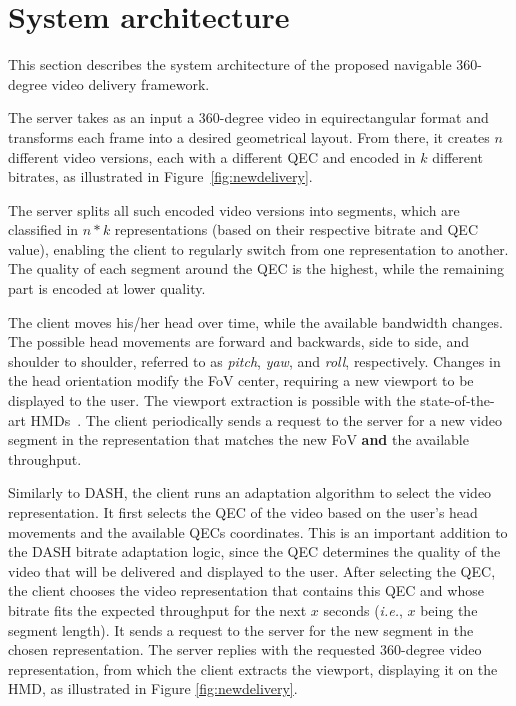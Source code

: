 \section{System architecture}

This section describes the system architecture of the proposed navigable 360-degree video delivery framework. %

 The server takes as an input a 360-degree video in equirectangular format and transforms each frame into a desired geometrical layout. From there, it creates $n$ different video versions, each with a different QEC and encoded in $k$ different bitrates, as illustrated in Figure~\ref{fig:newdelivery}.

The server splits all such encoded video versions into segments, which are classified in $n*k$ representations (based on their respective bitrate and QEC value), enabling the client to regularly switch from one representation to another. The quality of each segment around the QEC is the highest, while the remaining part is encoded at lower quality.

 The client moves his/her head over time, while the available bandwidth changes. The possible head movements are forward and backwards, side to side, and shoulder to shoulder, referred to as \emph{pitch}, \emph{yaw}, and \emph{roll}, respectively. Changes in the head orientation modify the FoV center, requiring a new viewport to be displayed to the user. The viewport extraction is possible with the state-of-the-art HMDs~\cite{fovhmds}. The client periodically sends a request to the server for a new video segment in the representation that matches the new FoV \textbf{and} the available throughput.

 Similarly to DASH, the client runs an adaptation algorithm to select the video representation.
It first selects the QEC of the video based on the user's head movements and the available QECs coordinates. This is an important addition to the DASH bitrate adaptation logic, since the QEC determines the quality of the video that will be delivered and displayed to the user. After selecting the QEC, the client chooses the video representation that contains this QEC and whose bitrate fits the expected throughput for the next $x$ seconds (\textit{i.e.}, $x$ being the segment length). It sends a request to the server for the new segment in the chosen representation. The server replies with the requested 360-degree video representation, from which the client extracts the viewport, displaying it on the HMD, as illustrated in Figure \ref{fig:newdelivery}. %

